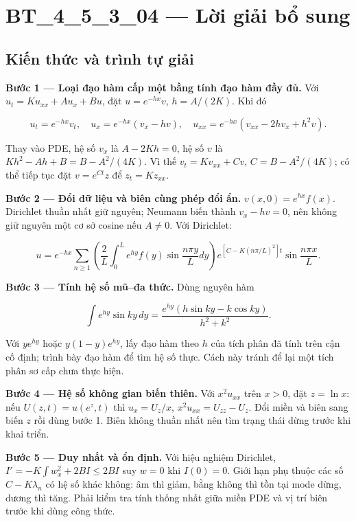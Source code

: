 \documentclass[10pt,a4paper]{article}
\begin{document}
\section*{BT\_4\_5\_3\_04 — Lời giải bổ sung}
\subsection*{Kiến thức và trình tự giải}
\textbf{Bước 1 — Loại đạo hàm cấp một bằng tính đạo hàm đầy đủ.} Với $u_t=Ku_{xx}+Au_x+Bu$, đặt $u=e^{-hx}v$, $h=A/(2K)$. Khi đó


\[
u_t=e^{-hx}v_t,\quad u_x=e^{-hx}(v_x-hv),\quad
u_{xx}=e^{-hx}(v_{xx}-2hv_x+h^2v).
\]


Thay vào PDE, hệ số $v_x$ là $A-2Kh=0$, hệ số $v$ là $Kh^2-Ah+B=B-A^2/(4K)$. Vì thế $v_t=Kv_{xx}+Cv$, $C=B-A^2/(4K)$; có thể tiếp tục đặt $v=e^{Ct}z$ để $z_t=Kz_{xx}$.

\textbf{Bước 2 — Đổi dữ liệu và biên cùng phép đổi ẩn.} $v(x,0)=e^{hx}f(x)$. Dirichlet thuần nhất giữ nguyên; Neumann biến thành $v_x-hv=0$, nên không giữ nguyên một cơ sở cosine nếu $A\ne0$. Với Dirichlet:


\[
u=e^{-hx}\sum_{n\ge1}\left(\frac2L\int_0^Le^{hy}f(y)\sin\frac{n\pi y}Ldy\right)
e^{[C-K(n\pi/L)^2]t}\sin\frac{n\pi x}L.
\]


\textbf{Bước 3 — Tính hệ số mũ–đa thức.} Dùng nguyên hàm


\[
\int e^{hy}\sin ky\,dy
=\frac{e^{hy}(h\sin ky-k\cos ky)}{h^2+k^2}.
\]


Với $y e^{hy}$ hoặc $y(1-y)e^{hy}$, lấy đạo hàm theo $h$ của tích phân đã tính trên cận cố định; trình bày đạo hàm để tìm hệ số thực. Cách này tránh để lại một tích phân sơ cấp chưa thực hiện.

\textbf{Bước 4 — Hệ số không gian biến thiên.} Với $x^2u_{xx}$ trên $x>0$, đặt $z=\ln x$: nếu $U(z,t)=u(e^z,t)$ thì $u_x=U_z/x$, $x^2u_{xx}=U_{zz}-U_z$. Đổi miền và biên sang biến $z$ rồi dùng bước 1. Biên không thuần nhất nên tìm trạng thái dừng trước khi khai triển.

\textbf{Bước 5 — Duy nhất và ổn định.} Với hiệu nghiệm Dirichlet, $I'=-K\int w_x^2+2BI\le2BI$ suy $w=0$ khi $I(0)=0$. Giới hạn phụ thuộc các số $C-K\lambda_n$ có hệ số khác không: âm thì giảm, bằng không thì tồn tại mode dừng, dương thì tăng. Phải kiểm tra tính thống nhất giữa miền PDE và vị trí biên trước khi dùng công thức.
\end{document}

